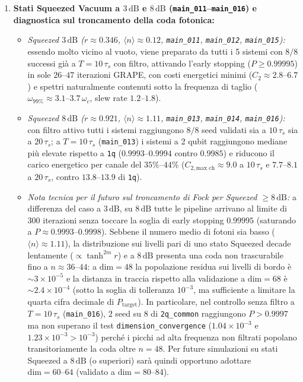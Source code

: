 \documentclass[11pt,a4paper]{article}
\begin{document}
\begin{enumerate}
    \item \textbf{Stati Squeezed Vacuum a $3\,\text{dB}$ e $8\,\text{dB}$ (\texttt{main\_011}--\texttt{main\_016}) e diagnostica sul troncamento della coda fotonica:}
    \begin{itemize}
        \item \emph{Squeezed $3\,\text{dB}$ ($r \approx 0.346$, $\langle n \rangle \approx 0.12$, \texttt{main\_011}, \texttt{main\_012}, \texttt{main\_015}):} essendo molto vicino al vuoto, viene preparato da tutti i 5 sistemi con $8/8$ successi già a $T = 10\,\tau_s$ con filtro, attivando l'early stopping ($P \ge 0.99995$) in sole $26\text{--}47$ iterazioni GRAPE, con costi energetici minimi ($C_2 \approx 2.8\text{--}6.7$) e spettri naturalmente contenuti sotto la frequenza di taglio ($\omega_{99\%} \approx 3.1\text{--}3.7\,\omega_c$, slew rate $1.2\text{--}1.8$).
        \item \emph{Squeezed $8\,\text{dB}$ ($r \approx 0.921$, $\langle n \rangle \approx 1.11$, \texttt{main\_013}, \texttt{main\_014}, \texttt{main\_016}):} con filtro attivo tutti i sistemi raggiungono $8/8$ seed validati sia a $10\,\tau_s$ sia a $20\,\tau_s$; a $T = 10\,\tau_s$ (\texttt{main\_013}) i sistemi a 2 qubit raggiungono mediane più elevate rispetto a \texttt{1q} ($0.9993\text{--}0.9994$ contro $0.9985$) e riducono il carico energetico per canale del $35\%\text{--}44\%$ ($C_{2,\text{max ch}} \approx 9.0$ a $10\,\tau_s$ e $7.7\text{--}8.1$ a $20\,\tau_s$, contro $13.8\text{--}13.9$ di \texttt{1q}).
        \item \emph{Nota tecnica per il futuro sul troncamento di Fock per Squeezed $\ge 8\,\text{dB}$:} a differenza del caso a $3\,\text{dB}$, su $8\,\text{dB}$ tutte le pipeline arrivano al limite di $300$ iterazioni senza toccare la soglia di early stopping $0.99995$ (saturando a $P \approx 0.9993\text{--}0.9998$). Sebbene il numero medio di fotoni sia basso ($\langle n \rangle \approx 1.11$), la distribuzione sui livelli pari di uno stato Squeezed decade lentamente ($\propto \tanh^{2m} r$) e a $8\,\text{dB}$ presenta una coda non trascurabile fino a $n \approx 36\text{--}44$: a $\text{dim}=48$ la popolazione residua sui livelli di bordo è $\sim 3\times 10^{-5}$ e la distanza in traccia rispetto alla validazione a $\text{dim}=68$ è $\sim 2.4\times 10^{-4}$ (sotto la soglia di tolleranza $10^{-3}$, ma sufficiente a limitare la quarta cifra decimale di $P_{\text{target}}$). In particolare, nel controllo senza filtro a $T = 10\,\tau_s$ (\texttt{main\_016}), $2$ seed su $8$ di \texttt{2q\_common} raggiungono $P > 0.9997$ ma non superano il test \texttt{dimension\_convergence} ($1.04\times 10^{-3}$ e $1.23\times 10^{-3} > 10^{-3}$) perché i picchi ad alta frequenza non filtrati popolano transitoriamente la coda oltre $n=48$. Per future simulazioni su stati Squeezed a $8\,\text{dB}$ (o superiori) sarà quindi opportuno adottare $\text{dim}=60\text{--}64$ (validato a $\text{dim}=80\text{--}84$).
    \end{itemize}


\end{enumerate}
\end{document}
